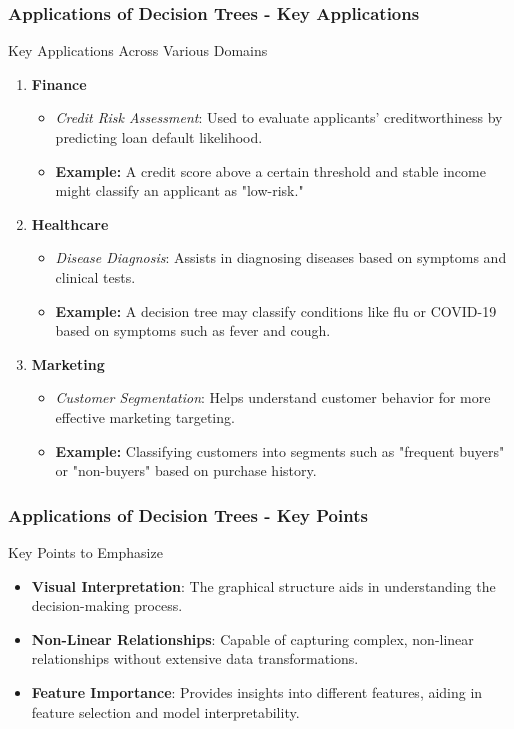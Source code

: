 \documentclass[aspectratio=169]{beamer}
\begin{document}
\begin{frame}[fragile]
    \frametitle{Applications of Decision Trees - Key Applications}
    \begin{block}{Key Applications Across Various Domains}
        \begin{enumerate}
            \item \textbf{Finance}
                \begin{itemize}
                    \item \textit{Credit Risk Assessment}: Used to evaluate applicants' creditworthiness by predicting loan default likelihood.
                    \item \textbf{Example:} A credit score above a certain threshold and stable income might classify an applicant as "low-risk."
                \end{itemize}
            
            \item \textbf{Healthcare}
                \begin{itemize}
                    \item \textit{Disease Diagnosis}: Assists in diagnosing diseases based on symptoms and clinical tests.
                    \item \textbf{Example:} A decision tree may classify conditions like flu or COVID-19 based on symptoms such as fever and cough.
                \end{itemize}
            
            \item \textbf{Marketing}
                \begin{itemize}
                    \item \textit{Customer Segmentation}: Helps understand customer behavior for more effective marketing targeting.
                    \item \textbf{Example:} Classifying customers into segments such as "frequent buyers" or "non-buyers" based on purchase history.
                \end{itemize}
        \end{enumerate}
    \end{block}
\end{frame}

\begin{frame}[fragile]
    \frametitle{Applications of Decision Trees - Key Points}
    \begin{block}{Key Points to Emphasize}
        \begin{itemize}
            \item \textbf{Visual Interpretation}: The graphical structure aids in understanding the decision-making process.
            \item \textbf{Non-Linear Relationships}: Capable of capturing complex, non-linear relationships without extensive data transformations.
            \item \textbf{Feature Importance}: Provides insights into different features, aiding in feature selection and model interpretability.
        \end{itemize}
    \end{block}
\end{frame}
\end{document}
